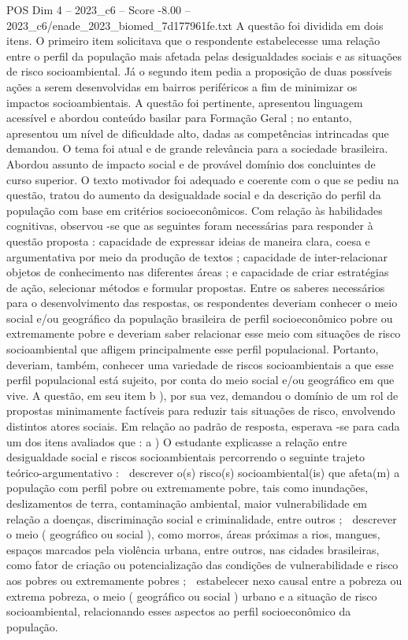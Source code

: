 \begin{textsample}{POS Dim 4 – 2023\_c6 – Score -8.00 – 2023\_c6/enade\_2023\_biomed\_7d177961fe.txt}
A questão foi dividida em dois itens.
O primeiro item solicitava que o respondente estabelecesse uma relação entre o perfil da população mais afetada pelas desigualdades sociais e as situações de risco socioambiental.
Já o segundo item pedia a proposição de duas possíveis ações a serem desenvolvidas em bairros periféricos a fim de minimizar os impactos socioambientais.
A questão foi pertinente, apresentou linguagem acessível e abordou conteúdo basilar para Formação Geral ; no entanto, apresentou um nível de dificuldade alto, dadas as competências intrincadas que demandou.
O tema foi atual e de grande relevância para a sociedade brasileira.
Abordou assunto de impacto social e de provável domínio dos concluintes de curso superior.
O texto motivador foi adequado e coerente com o que se pediu na questão, tratou do aumento da desigualdade social e da descrição do perfil da população com base em critérios socioeconômicos.
Com relação às habilidades cognitivas, observou -se que as seguintes foram necessárias para responder à questão proposta : capacidade de expressar ideias de maneira clara, coesa e argumentativa por meio da produção de textos ; capacidade de inter-relacionar objetos de conhecimento nas diferentes áreas ; e capacidade de criar estratégias de ação, selecionar métodos e formular propostas.
Entre os saberes necessários para o desenvolvimento das respostas, os respondentes deveriam conhecer o meio social e/ou geográfico da população brasileira de perfil socioeconômico pobre ou extremamente pobre e deveriam saber relacionar esse meio com situações de risco socioambiental que afligem principalmente esse perfil populacional.
Portanto, deveriam, também, conhecer uma variedade de riscos socioambientais a que esse perfil populacional está sujeito, por conta do meio social e/ou geográfico em que vive.
A questão, em seu item b ), por sua vez, demandou o domínio de um rol de propostas minimamente factíveis para reduzir tais situações de risco, envolvendo distintos atores sociais.
Em relação ao padrão de resposta, esperava -se para cada um dos itens avaliados que : a ) O estudante explicasse a relação entre desigualdade social e riscos socioambientais percorrendo o seguinte trajeto teórico-argumentativo :  descrever o(s) risco(s) socioambiental(is) que afeta(m) a população com perfil pobre ou extremamente pobre, tais como inundações, deslizamentos de terra, contaminação ambiental, maior vulnerabilidade em relação a doenças, discriminação social e criminalidade, entre outros ;  descrever o meio ( geográfico ou social ), como morros, áreas próximas a rios, mangues, espaços marcados pela violência urbana, entre outros, nas cidades brasileiras, como fator de criação ou potencialização das condições de vulnerabilidade e risco aos pobres ou extremamente pobres ;  estabelecer nexo causal entre a pobreza ou extrema pobreza, o meio ( geográfico ou social ) urbano e a situação de risco socioambiental, relacionando esses aspectos ao perfil socioeconômico da população.

\end{textsample}
